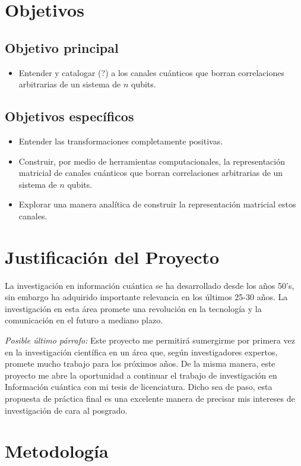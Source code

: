 \documentclass[11pt, spanish, letterpage]{article}
\begin{document}
\section{Objetivos}
\subsection{Objetivo principal}
\begin{itemize}
	\item Entender y catalogar (?) a los canales cuánticos que borran correlaciones arbitrarias de un sistema de $n$ qubits. 	
\end{itemize}

\subsection{Objetivos específicos}
\begin{itemize}
	\item Entender las transformaciones completamente positivas. 
	\item Construir, por medio de herramientas computacionales, la representación matricial de canales cuánticos que borran correlaciones arbitrarias de un sistema de $n$ qubits. 
	\item Explorar una manera analítica de construir la representación matricial estos canales.
\end{itemize}

\section{Justificación del Proyecto}
La investigación en información cuántica se ha desarrollado desde los años 50's, sin embargo ha adquirido importante relevancia en los últimos 25-30 años. La investigación en esta área promete una revolución en la tecnología y la comunicación en el futuro a mediano plazo.  

\textit{Posible último párrafo:} Este proyecto me permitirá sumergirme por primera vez en la investigación científica en un área que, según investigadores expertos, promete mucho trabajo para los próximos años. De la misma manera, este proyecto me abre la oportunidad a continuar el trabajo de investigación en Información cuántica con mi tesis de licenciatura. Dicho sea de paso, esta propuesta de práctica final es una excelente manera de precisar mis intereses de investigación de cara al posgrado. 

\section{Metodología}
\end{document}
